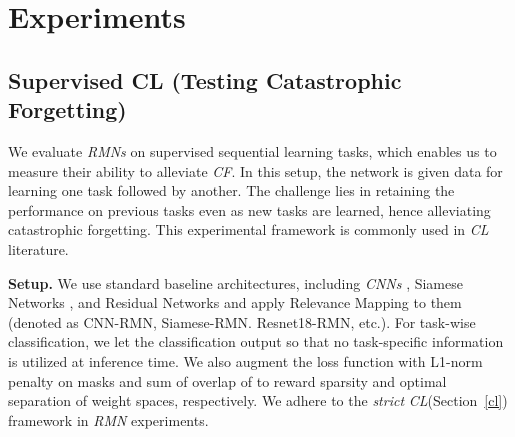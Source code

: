 \documentclass{article}
\begin{document}
\iffalse
\begin{algorithm}[tb]
	\caption{RMN Unsupervised Continual Learning for CR Testing}
	\label{algo2}
\begin{algorithmic}[1]
    \STATE {\bfseries Input:} data , ground truth 
    \STATE {\bfseries Given:} parameters ,  with , Task Switch Detection Method \textit{TSD}
	\FOR{each task }
	\STATE 
	\STATE Compute Loss :  
	\IF{ is True}
	\STATE 
	\STATE Add  to learn-able parameter list
	\STATE 
	\STATE Re-Compute Loss : 
	\ENDIF
	\STATE Backpropagate and optimize
	\STATE Sample  from standard Gaussian distribution with same shape as 
\STATE 
	\STATE Compute Loss :  
	\STATE Backpropagate and optimize
	\STATE Stabilize (fix) parameters in  where 
	\ENDFOR
	\STATE {\bfseries Inference:} For data :
	\STATE {\bfseries Output:} 
\end{algorithmic}
\end{algorithm}
\fi
\section{Experiments}\label{ex}


\subsection{Supervised CL (Testing Catastrophic Forgetting)}\label{cf-ex}

We evaluate \textit{RMNs} on supervised sequential learning tasks, which enables us to measure their ability to alleviate \textit{CF}. In this setup, the network is given data for learning one task followed by another. The challenge lies in retaining the performance on previous tasks even as new tasks are learned, hence alleviating catastrophic forgetting. This experimental framework is commonly used in \textit{CL} literature.  

\textbf{Setup.}  
We use standard baseline architectures, including \textit{CNNs} \cite{lecun1995convolutional}, Siamese Networks \cite{koch2015siamese}, and Residual Networks\cite{he2015deep} and apply Relevance Mapping to them (denoted as CNN-RMN, Siamese-RMN. Resnet18-RMN, etc.). For task-wise classification, we let the classification output  so that no task-specific information is utilized at inference time. We also augment the loss function with L1-norm penalty on  masks and sum of overlap of  to reward sparsity and optimal separation of weight spaces, respectively. We adhere to the \textit{strict} \textit{CL}(Section~\ref{cl}) framework in \textit{RMN} experiments. 
\end{document}
